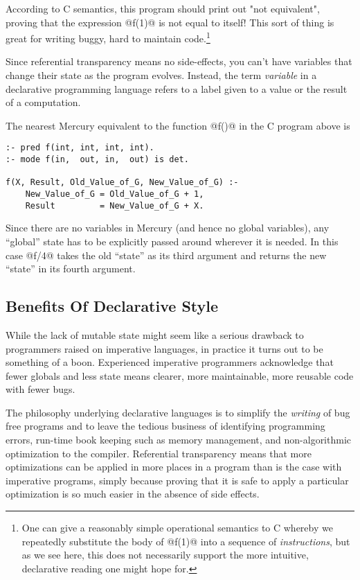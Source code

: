 \documentclass[a4paper,11pt,notitlepage,onecolumn]{article}
\begin{document}
According to C semantics, this program should print out "not
equivalent", proving that the expression @f(1)@ is not equal to
itself!  This sort of thing is great for writing buggy, hard to
maintain code.\footnote{One can give a reasonably simple
operational semantics to C whereby we repeatedly substitute the
body of @f(1)@ into a sequence of \emph{instructions}, but as we
see here, this does not necessarily support the more intuitive,
declarative reading one might hope for.}

Since referential transparency means no side-effects, you can't have
variables that change their state as the program evolves.  Instead, the
term \emph{variable} in a declarative programming language refers to a
label given to a value or the result of a computation.

The nearest Mercury equivalent to the function @f()@ in the C
program above is

\begin{verbatim}
:- pred f(int, int, int, int).
:- mode f(in,  out, in,  out) is det.

f(X, Result, Old_Value_of_G, New_Value_of_G) :-
    New_Value_of_G = Old_Value_of_G + 1,
    Result         = New_Value_of_G + X.
\end{verbatim}

Since there are no variables in Mercury (and hence no global
variables), any ``global'' state has to be explicitly passed
around wherever it is needed.  In this case @f/4@ takes the old
``state'' as its third argument and returns the new ``state'' in
its fourth argument.

\subsection{Benefits Of Declarative Style}

While the lack of mutable state might seem like a serious
drawback to programmers raised on imperative languages, in
practice it turns out to be something of a boon.  Experienced
imperative programmers acknowledge that fewer globals and less
state means clearer, more maintainable, more reusable code
with fewer bugs.

The philosophy underlying declarative languages is to simplify the
\emph{writing} of bug free programs and to leave the tedious
business of identifying programming errors, run-time book
keeping such as memory management, and non-algorithmic
optimization to the compiler.  Referential transparency means
that more optimizations can be applied in more places in a
program than is the case with imperative programs, simply
because proving that it is safe to apply a particular
optimization is so much easier in the absence of side effects.
\end{document}
